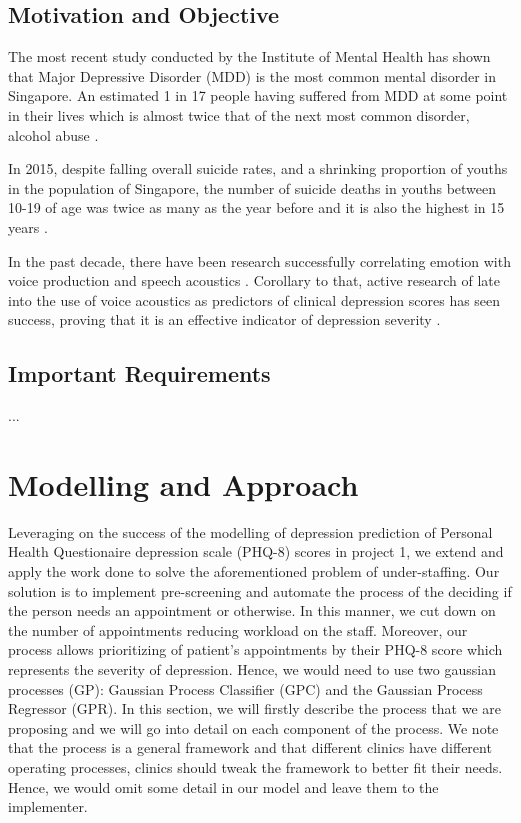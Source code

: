 \documentclass{article}
\begin{document}
	\subsection{Motivation and Objective}
	The most recent study conducted by the Institute of Mental Health has shown that Major Depressive Disorder (MDD) is the most common mental disorder in Singapore. An estimated 1 in 17 people having suffered from MDD at some point in their lives which is almost twice that of the next most common disorder, alcohol abuse \cite{annacadmedsg}.

	In 2015, despite falling overall suicide rates, and a shrinking proportion of youths in the population of Singapore, the number of suicide deaths in youths between 10-19 of age was twice as many as the year before and it is also the highest in 15 years \cite{samaritansofsingapore2016}.
	
	In the past decade, there have been research successfully correlating emotion with voice production and speech acoustics \cite{uwa2001}. 
	Corollary to that, active research of late into the use of voice acoustics as predictors of clinical depression scores has seen success, proving that it is an effective indicator of depression severity \cite{jov2016}.\\
	
	\subsection{Important Requirements}
	...
	
	\section{Modelling and Approach}
	Leveraging on the success of the modelling of depression prediction of Personal Health Questionaire depression scale (PHQ-8) scores in project 1, we extend and apply the work done to solve the aforementioned problem of under-staffing.
	Our solution is to implement pre-screening and automate the process of the deciding if the person needs an appointment or otherwise.
	In this manner, we cut down on the number of appointments reducing workload on the staff. 
	Moreover, our process allows prioritizing of patient's appointments by their PHQ-8 score which represents the severity of depression.
	Hence, we would need to use two gaussian processes (GP): Gaussian Process Classifier (GPC) and the Gaussian Process Regressor (GPR). 
	In this section, we will firstly describe the process that we are proposing and we will go into detail on each component of the process. 
	We note that the process is a general framework and that different clinics have different operating processes, clinics should tweak the framework to better fit their needs. 
	Hence, we would omit some detail in our model and leave them to the implementer.
\end{document}
